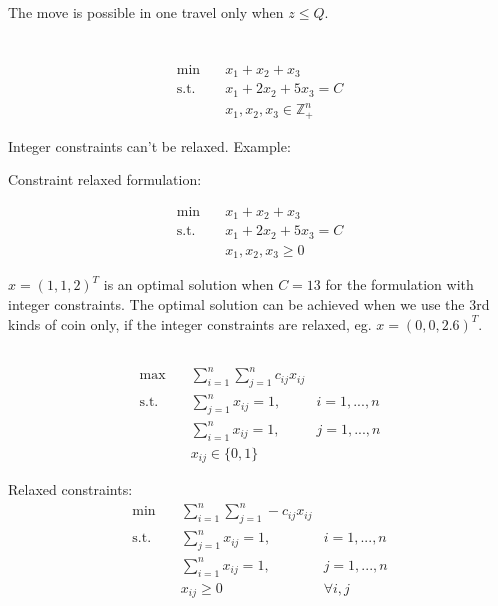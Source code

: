 \documentclass{article}
\newcommand{\1}{\bm 1}
\begin{document}
The move is possible in one travel only when $z\le Q$.

\section{}
\subsection{}
\begin{align*}
    \min \quad & x_1 + x_2 + x_3  \\
    \text{s.t.} \quad & x_1 + 2x_2+5x_3 = C \\
    & x_1, x_2, x_3 \in \mathbb{Z}^{n}_+
\end{align*}

Integer constraints can't be relaxed. Example:

Constraint relaxed formulation:

\begin{align*}
    \min \quad & x_1 + x_2 + x_3  \\
    \text{s.t.} \quad & x_1 + 2x_2+5x_3 = C \\
    & x_1, x_2, x_3 \geq 0
\end{align*}

$x = (1,1,2)^T$ is an optimal solution when $C = 13$ for the formulation with integer constraints. The optimal solution can be achieved when we use the 3rd kinds of coin only, if the integer constraints are relaxed, eg. $x = (0,0,2.6)^T$.

\subsection{}
\begin{align*}
    \max \quad & \sum^{n}_{i=1}\sum^{n}_{j=1} c_{ij}x_{ij}   \\
    \text{s.t.} \quad & \sum^{n}_{j=1} x_{ij} = 1, & i = 1, ..., n \\
    & \sum^{n}_{i=1} x_{ij} = 1, & j = 1, ..., n\\
    & x_{ij} \in \{0, 1\}
\end{align*}

Relaxed constraints:
\begin{align*}
    \min \quad & \sum^{n}_{i=1}\sum^{n}_{j=1} -c_{ij}x_{ij}   \\
    \text{s.t.} \quad & \sum^{n}_{j=1} x_{ij} = 1, & i = 1, ..., n \\
    & \sum^{n}_{i=1} x_{ij} = 1, & j = 1, ..., n\\
    & x_{ij} \geq 0 & \forall i,j
\end{align*}
\end{document}

